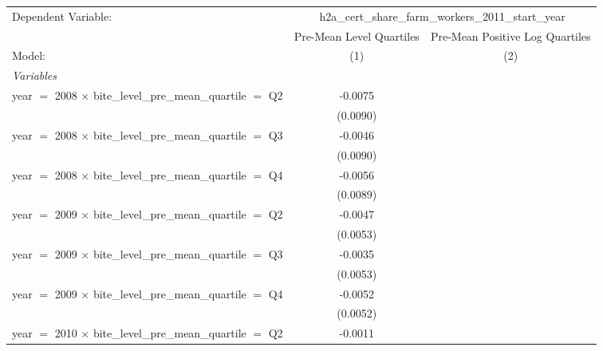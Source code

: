 
\begingroup
\centering
\begin{tabular}{lcc}
   \tabularnewline \midrule \midrule
   Dependent Variable: & \multicolumn{2}{c}{h2a\_cert\_share\_farm\_workers\_2011\_start\_year}\\
                                                                              & Pre-Mean Level Quartiles & Pre-Mean Positive Log Quartiles \\   
   Model:                                                                     & (1)                      & (2)\\  
   \midrule
   \emph{Variables}\\
   year $=$ 2008 $\times$ bite\_level\_pre\_mean\_quartile $=$ Q2             & -0.0075                  &   \\   
                                                                              & (0.0090)                 &   \\   
   year $=$ 2008 $\times$ bite\_level\_pre\_mean\_quartile $=$ Q3             & -0.0046                  &   \\   
                                                                              & (0.0090)                 &   \\   
   year $=$ 2008 $\times$ bite\_level\_pre\_mean\_quartile $=$ Q4             & -0.0056                  &   \\   
                                                                              & (0.0089)                 &   \\   
   year $=$ 2009 $\times$ bite\_level\_pre\_mean\_quartile $=$ Q2             & -0.0047                  &   \\   
                                                                              & (0.0053)                 &   \\   
   year $=$ 2009 $\times$ bite\_level\_pre\_mean\_quartile $=$ Q3             & -0.0035                  &   \\   
                                                                              & (0.0053)                 &   \\   
   year $=$ 2009 $\times$ bite\_level\_pre\_mean\_quartile $=$ Q4             & -0.0052                  &   \\   
                                                                              & (0.0052)                 &   \\   
   year $=$ 2010 $\times$ bite\_level\_pre\_mean\_quartile $=$ Q2             & -0.0011                  &   \\   

\end{tabular}
